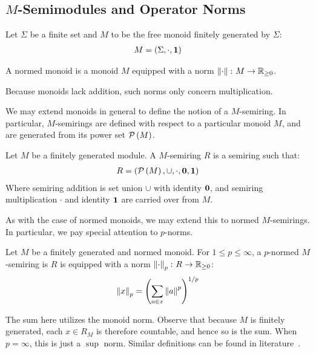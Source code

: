 
\subsection{\(M\)-Semimodules and Operator Norms}
Let \(\Sigma\) be a finite set and
\(M\) to be the free monoid finitely generated by \(\Sigma\):
\begin{align*}
  M = \left(\Sigma, \cdot, \mathbf{1}\right)
\end{align*}

\begin{definition}
  A normed monoid is a monoid \(M\) equipped with a norm
  \(\left\lVert\cdot\right\rVert \colon M \to \mathbb{R}_{\geq 0}\).
\end{definition}

Because monoids lack addition,
such norms only concern multiplication.

We may extend monoids in general to define the notion of a \(M\)-semiring.
In particular,
\(M\)-semirings are defined with respect to a particular monoid \(M\),
and are generated from its power set \(\mathcal{P}\left(M\right)\).

\begin{definition}[\(M\)-Semiring]
  Let \(M\) be a finitely generated module.
  A \(M\)-semiring \(R\) is a semiring such that:
  \begin{align*}
    R = \left(\mathcal{P}\left(M\right), \cup, \cdot, \mathbf{0}, \mathbf{1}\right)
  \end{align*}
  Where semiring addition is set union \(\cup\) with identity \(\mathbf{0}\),
  and semiring multiplication \(\cdot\) and identity \(\mathbf{1}\)
  are carried over from \(M\).
\end{definition}

As with the case of normed monoids,
we may extend this to normed \(M\)-semirings.
In particular, we pay special attention to \(p\)-norms.

\begin{definition}
  Let \(M\) be a finitely generated and normed monoid.
  For \(1 \leq p \leq \infty\),
  a \(p\)-normed \(M\)-semiring is \(R\)
  is equipped with a norm \(\left\lVert\cdot\right\rVert_p \colon R \to \mathbb{R}_{\geq 0}\):
  \begin{align*}
    \left\lVert x\right\rVert_{p} = \left(\sum_{a \in x} \left\lVert a\right\rVert ^p\right)^{1/p}
  \end{align*}
\end{definition}

The sum here utilizes the monoid norm.
Observe that because \(M\) is finitely generated,
each \(x \in R_M\) is therefore countable,
and hence so is the sum.
When \(p = \infty\), this is just a \(\sup\) norm.
Similar definitions can be found in literature~\cite{kudlek2000lemmata}.

